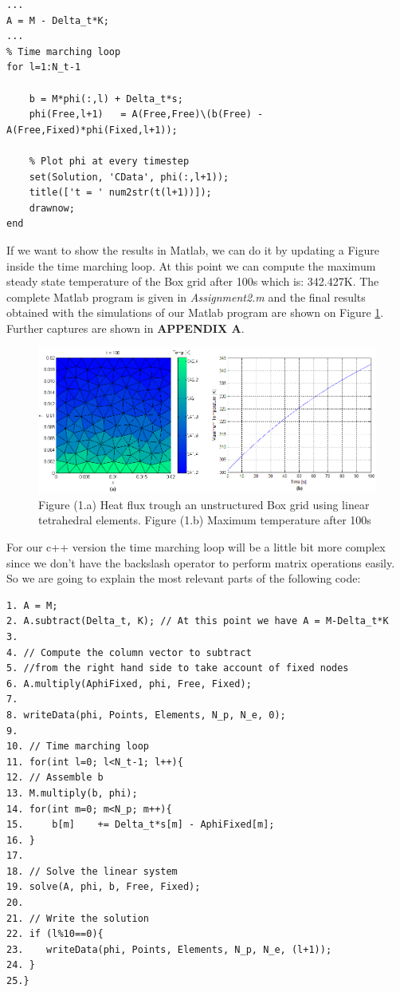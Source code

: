 \documentclass[12pt]{article}
\begin{document}
\begin{lstlisting}
...
A = M - Delta_t*K;
...
% Time marching loop
for l=1:N_t-1
	
	b = M*phi(:,l) + Delta_t*s;
	phi(Free,l+1)	= A(Free,Free)\(b(Free) - A(Free,Fixed)*phi(Fixed,l+1));
	
	% Plot phi at every timestep
    set(Solution, 'CData', phi(:,l+1));
    title(['t = ' num2str(t(l+1))]);
    drawnow;
end
\end{lstlisting}

If we want to show the results in Matlab, we can do it by updating a Figure inside the time marching loop. At this point we can compute the maximum steady state temperature of the Box grid after 100s which is: 342.427K. The complete Matlab program is given in \textit{Assignment2.m} and the final results obtained with the simulations of our Matlab program are shown on Figure \ref{fig:matlab1}. Further captures are shown in \textbf{APPENDIX A}.

\begin{figure}[h!]
    \includegraphics[scale=0.6]{matlab1}
    \caption{Figure (1.a) Heat flux trough an unstructured Box grid using linear tetrahedral elements. Figure (1.b) Maximum temperature after 100s}
    \label{fig:matlab1}
\end{figure}

For our c++ version the time marching loop will be a little bit more complex since we don't have the backslash operator to perform matrix operations easily. So we are going to explain the most relevant parts of the following code:

\begin{lstlisting}[style=MyC++Style] 
1. A = M;
2. A.subtract(Delta_t, K); // At this point we have A = M-Delta_t*K
3.
4. // Compute the column vector to subtract 
5. //from the right hand side to take account of fixed nodes
6. A.multiply(AphiFixed, phi, Free, Fixed);
7.
8. writeData(phi, Points, Elements, N_p, N_e, 0);
9. 
10. // Time marching loop
11. for(int l=0; l<N_t-1; l++){
12.	// Assemble b
13.	M.multiply(b, phi);
14.	for(int m=0; m<N_p; m++){
15.		b[m]	+= Delta_t*s[m] - AphiFixed[m];
16.	}
17.
18.	// Solve the linear system
19.	solve(A, phi, b, Free, Fixed);
20.
21.	// Write the solution
22.	if (l%10==0){
23.	   writeData(phi, Points, Elements, N_p, N_e, (l+1));
24.	}
25.}
\end{lstlisting}
\end{document}
